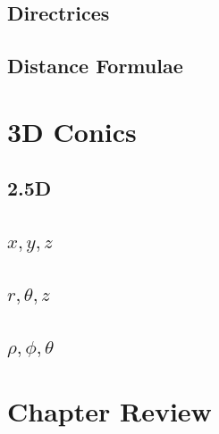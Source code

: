 \subsection{Directrices}
\subsection{Distance Formulae}

\newpage
\section{3D Conics}
\noindent{}
\subsection{2.5D}
\subsection{$x, y, z$}
\subsection{$r, \theta, z$}
\subsection{$\rho, \phi, \theta$}

\section{Chapter Review}